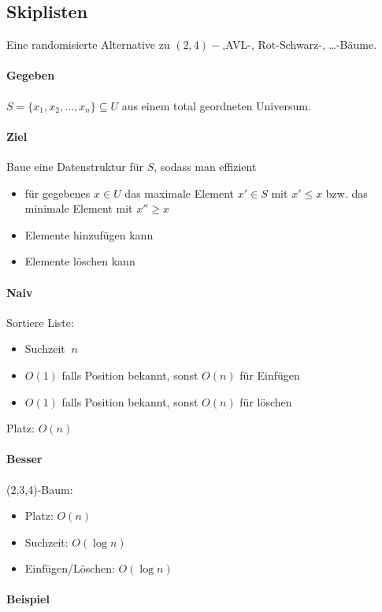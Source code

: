 \subsection{Skiplisten}
Eine randomisierte Alternative zu $(2,4)-$,AVL-, Rot-Schwarz-, \dots -Bäume.

\paragraph*{Gegeben} $S = \{ x_1, x_2, \dots, x_n\} \subseteq U$ aus einem total geordneten Universum.

\paragraph*{Ziel} Baue eine Datenstruktur für $S$, sodass man effizient
\begin{itemize}
	\item für gegebenes $x \in U$ das maximale Element $x' \in S$ mit $x' \leq x$ bzw. das minimale Element mit $x'' \geq x$
	\item Elemente hinzufügen kann
	\item Elemente löschen kann
\end{itemize}

\paragraph*{Naiv} Sortiere Liste:
\begin{itemize}
	\item Suchzeit $~n$ %
	\item $O(1)$ falls Position bekannt, sonst $O(n)$ für Einfügen
	\item $O(1)$ falls Position bekannt, sonst $O(n)$ für löschen
\end{itemize}
Platz: $O(n)$

\paragraph*{Besser} (2,3,4)-Baum:
\begin{itemize}
	\item Platz: $O(n)$
	\item Suchzeit: $O(\log n)$
	\item Einfügen/Löschen: $O(\log n)$
\end{itemize}

\paragraph*{Beispiel} %

